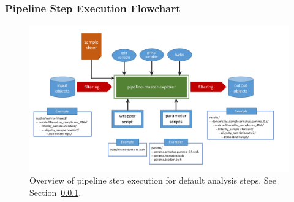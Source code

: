 \subsubsection{Pipeline Step Execution Flowchart}\label{HiC:pipeline-flowchart}
\begin{figure}[!htb]
    \centering
    \includegraphics[width=\textwidth,height=\textheight,keepaspectratio]{figure/HiC_flowchart_Figure_2}
    \caption{Overview of pipeline step execution for default analysis steps. See Section~\ref{HiC:pipeline-flowchart}.} %
    \label{fig:pipeline-flowchart}
\end{figure}
\clearpage